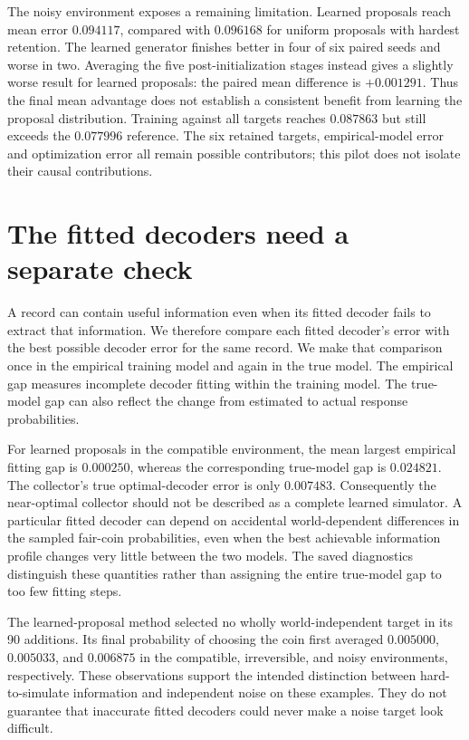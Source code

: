 \documentclass[11pt]{article}
\begin{document}
The noisy environment exposes a remaining limitation. Learned proposals reach
mean error $0.094117$, compared with $0.096168$ for uniform proposals with
hardest retention. The learned generator finishes better in four of six paired
seeds and worse in two. Averaging the five post-initialization stages instead
gives a slightly worse result for learned proposals: the paired mean difference
is $+0.001291$. Thus the final mean advantage does not establish a consistent
benefit from learning the proposal distribution. Training against all targets
reaches $0.087863$ but still exceeds the $0.077996$ reference. The six retained
targets, empirical-model error and optimization error all remain possible
contributors; this pilot does not isolate their causal contributions.

\section{The fitted decoders need a separate check}

A record can contain useful information even when its fitted decoder fails to
extract that information. We therefore compare each fitted decoder's error
with the best possible decoder error for the same record. We make that
comparison once in the empirical training model and again in the true model.
The empirical gap measures incomplete decoder fitting within the training
model. The true-model gap can also reflect the change from estimated to actual
response probabilities.

For learned proposals in the compatible environment, the mean largest empirical
fitting gap is $0.000250$, whereas the corresponding true-model gap is
$0.024821$. The collector's true optimal-decoder error is only $0.007483$.
Consequently the near-optimal collector should not be described as a complete
learned simulator. A particular fitted decoder can depend on accidental
world-dependent differences in the sampled fair-coin probabilities, even when
the best achievable information profile changes very little between the two
models. The saved diagnostics distinguish these quantities rather than assigning
the entire true-model gap to too few fitting steps.

The learned-proposal method selected no wholly world-independent target in its
90 additions. Its final probability of choosing the coin first averaged
$0.005000$, $0.005033$, and $0.006875$ in the compatible, irreversible, and noisy
environments, respectively. These observations support the intended distinction
between hard-to-simulate information and independent noise on these examples.
They do not guarantee that inaccurate fitted decoders could never make a noise
target look difficult.
\end{document}
